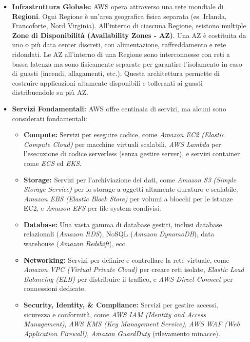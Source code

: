 \begin{itemize}
    \item \textbf{Infrastruttura Globale:} AWS opera attraverso una rete mondiale di \textbf{Regioni}. Ogni Regione è un'area geografica fisica separata (es. Irlanda, Francoforte, Nord Virginia). All'interno di ciascuna Regione, esistono multiple \textbf{Zone di Disponibilità (Availability Zones - AZ)}. Una AZ è costituita da uno o più data center discreti, con alimentazione, raffreddamento e rete ridondati. Le AZ all'interno di una Regione sono interconnesse con reti a bassa latenza ma sono fisicamente separate per garantire l'isolamento in caso di guasti (incendi, allagamenti, etc.). Questa architettura permette di costruire applicazioni altamente disponibili e tolleranti ai guasti distribuendole su più AZ.
    \item \textbf{Servizi Fondamentali:} AWS offre centinaia di servizi, ma alcuni sono considerati fondamentali:
        \begin{itemize}
            \item \textbf{Compute:} Servizi per eseguire codice, come \textit{Amazon EC2 (Elastic Compute Cloud)} per macchine virtuali scalabili, \textit{AWS Lambda} per l'esecuzione di codice serverless (senza gestire server), e servizi container come \textit{ECS} ed \textit{EKS}.
            \item \textbf{Storage:} Servizi per l'archiviazione dei dati, come \textit{Amazon S3 (Simple Storage Service)} per lo storage a oggetti altamente duraturo e scalabile, \textit{Amazon EBS (Elastic Block Store)} per volumi a blocchi per le istanze EC2, e \textit{Amazon EFS} per file system condivisi.
            \item \textbf{Database:} Una vasta gamma di database gestiti, inclusi database relazionali (\textit{Amazon RDS}), NoSQL (\textit{Amazon DynamoDB}), data warehouse (\textit{Amazon Redshift}), ecc.
            \item \textbf{Networking:} Servizi per definire e controllare la rete virtuale, come \textit{Amazon VPC (Virtual Private Cloud)} per creare reti isolate, \textit{Elastic Load Balancing (ELB)} per distribuire il traffico, e \textit{AWS Direct Connect} per connessioni dedicate.
            \item \textbf{Security, Identity, \& Compliance:} Servizi per gestire accessi, sicurezza e conformità, come \textit{AWS IAM (Identity and Access Management)}, \textit{AWS KMS (Key Management Service)}, \textit{AWS WAF (Web Application Firewall)}, \textit{Amazon GuardDuty} (rilevamento minacce).

\end{itemize}
\end{itemize}
